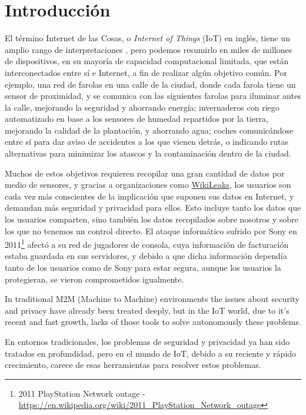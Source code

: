 \chapter*{Introducción}\label{ch:introduccion}

El término Internet de las Cosas, o \textit{Internet of Things} (IoT) en inglés, tiene un amplio rango de interpretaciones \citep{Atzori20102787}, pero podemos resumirlo en miles de millones de dispositivos, en su mayoría de capacidad computacional limitada, que están interconectados entre sí e Internet, a fin de realizar algún objetivo común. Por ejemplo, una red de farolas en una calle de la ciudad, donde cada farola tiene un sensor de proximidad, y se comunica con las siguientes farolas para iluminar antes la calle, mejorando la seguridad y ahorrando energía; invernaderos con riego automatizado en base a los sensores de humedad repartidos por la tierra, mejorando la calidad de la plantación, y ahorrando agua; coches comunicándose entre sí para dar aviso de accidentes a los que vienen detrás, o indicando rutas alternativas para minimizar los atascos y la contaminación dentro de la ciudad. 


Muchos de estos objetivos requieren recopilar una gran cantidad de datos por medio de sensores, y gracias a organizaciones como \href{https://wikileaks.org/}{WikiLeaks}, los usuarios son cada vez más conscientes de la implicación que suponen sus datos en Internet, y demandan más seguridad y privacidad para ellos. Esto incluye tanto los datos que los usuarios comparten, sino también los datos recopilados sobre nosotros y sobre los que no tenemos un control directo. El ataque informático sufrido por Sony en 2011\footnote{2011 PlayStation Network outage - 
\url{https://en.wikipedia.org/wiki/2011_PlayStation_Network_outage}} afectó a su red de jugadores de consola, cuya información de facturación estaba guardada en sus servidores, y debido a que dicha información dependía tanto de los usuarios como de Sony para estar segura, aunque los usuarios la protegieran, se vieron comprometidos igualmente.

In traditional M2M (Machine to Machine) environments the issues about security and privacy have already been treated deeply, but in the IoT world, due to it's recent and fast growth, lacks of those tools to solve autonomously these problems.

En entornos tradicionales, los problemas de seguridad y privacidad ya han sido tratados en profundidad, pero en el mundo de IoT, debido a su reciente y rápido crecimiento, carece de esas herramientas para resolver estos problemas.

